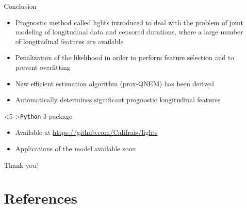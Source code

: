 \documentclass{beamer}
\begin{document}
\begin{frame}{Conclusion}

\begin{itemize}
  \item<1-> Prognostic method called lights introduced to deal with the problem of joint modeling of longitudinal data and censored durations, where a large number of longitudinal features are available
  \item<2-> Penalization of the likelihood in order to perform feature selection and to prevent overfitting
  \item<3-> New efficient estimation algorithm (prox-QNEM) has been derived
  \item<4-> Automatically determines significant prognostic longitudinal features
\end{itemize}

\begin{block}<5->{\texttt{Python} 3 package}
\begin{itemize}
  \item<5-> Available at \small{\url{https://github.com/Califrais/lights}}
  \item<6-> Applications of the model available soon
\end{itemize}
\end{block}

\end{frame}

\begin{frame}[noframenumbering]
\Large \centering
\textcolor{blue_pres}{} Thank you!
\end{frame}

\section{References}
\end{document}

